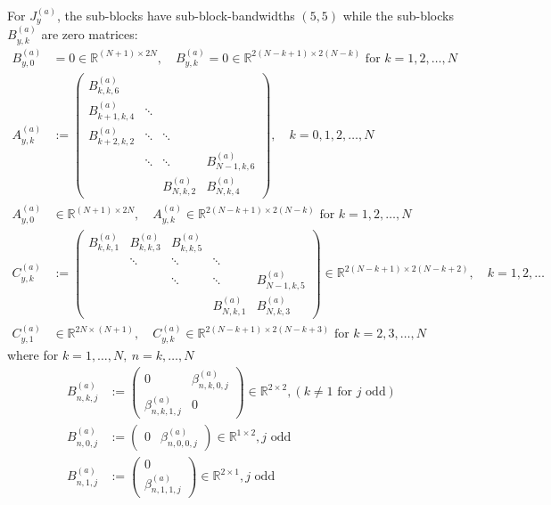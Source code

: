 \documentclass[11pt, oneside]{article}   	%
\newcommand{\R}{\mathbb{R}}
\newcommand{\betaa}{\beta^{(a)}}
\begin{document}
For $J_y^{(a)}$, the sub-blocks have sub-block-bandwidths $(5,5)$ while the sub-blocks $B^{(a)}_{y,k}$ are zero matrices:
\begin{align*}
	B^{(a)}_{y,0} &= 0 \in \R^{(N+1)\times2N}, \quad B^{(a)}_{y,k} = 0 \in \R^{2(N-k+1)\times2(N-k)} \text{ for } k = 1,2,\dots,N \\
	A^{(a)}_{y,k} &:= 
		\begin{pmatrix}
			B^{(a)}_{k,k,6} & & & \\
			B^{(a)}_{k+1,k,4} & \ddots & & \\
			B^{(a)}_{k+2,k,2} & \ddots & \ddots & \\
			& \ddots & \ddots & B^{(a)}_{N-1,k,6} \\
			& & B^{(a)}_{N,k,2} & B^{(a)}_{N,k,4}
		\end{pmatrix}, \quad k = 0,1,2,\dots,N \\
	A^{(a)}_{y,0} &\in \R^{(N+1)\times2N}, \quad A^{(a)}_{y,k} \in \R^{2(N-k+1)\times2(N-k)} \text{ for } k = 1,2,\dots,N \\
	C^{(a)}_{y,k} &:= 
		\begin{pmatrix}
			B^{(a)}_{k,k,1} & B^{(a)}_{k,k,3} & B^{(a)}_{k,k,5} & & \\
			& \ddots & \ddots & \ddots \\
			& & \ddots & \ddots & B^{(a)}_{N-1,k,5} \\
			& & & B^{(a)}_{N,k,1} & B^{(a)}_{N,k,3}
		\end{pmatrix} \in \R^{2(N-k+1)\times2(N-k+2)}, \quad k = 1,2,\dots \\
	C^{(a)}_{y,1} &\in \R^{2N\times(N+1)}, \quad C^{(a)}_{y,k} \in \R^{2(N-k+1)\times2(N-k+3)} \text{ for } k = 2,3,\dots,N
\end{align*}
where for $k = 1,\dots,N, \: n = k,\dots,N$
\begin{align}
	B^{(a)}_{n,k,j} &:= 
		\begin{pmatrix}
			0 & \betaa_{n,k,0,j} \\
			\betaa_{n,k,1,j} & 0
		\end{pmatrix} \in \R^{2\times2}, (k \ne 1 \text { for } j \text{ odd}) \label{eqn:jacobisubblocksB1} \\
	B^{(a)}_{n,0,j} &:=
		\begin{pmatrix}
			0 & \betaa_{n,0,0,j}
		\end{pmatrix} \in \R^{1\times2}, j \text{ odd}  \label{eqn:jacobisubblocksB2} \\
	B^{(a)}_{n,1,j} &:=
		\begin{pmatrix}
			0 \\
			\betaa_{n,1,1,j}
		\end{pmatrix}\in \R^{2\times1}, j \text{ odd}  \label{eqn:jacobisubblocksB3} \\
\end{align}
\end{document}
